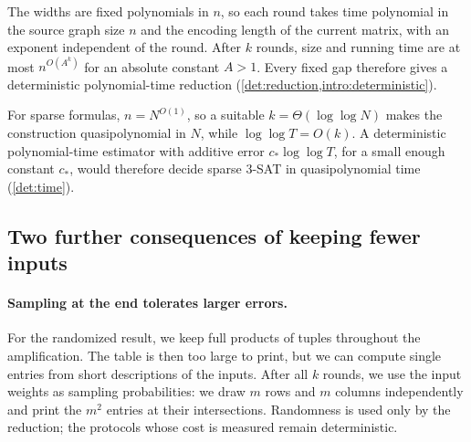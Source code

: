 \documentclass[11pt,letterpaper]{article} \usepackage[utf8]{inputenc}
\theoremstyle{plain} \newtheorem{theorem}{Theorem}[section]
\theoremstyle{definition} \newaliascnt{definition}{theorem}
\begin{document}
The widths are fixed polynomials in $n$, so each round takes time polynomial in the
source graph size $n$ and the encoding length of the current matrix,
with an exponent independent of the round. After $k$ rounds, size and
running time are at most $n^{O(A^k)}$ for an absolute constant $A>1$.
Every fixed gap therefore gives a deterministic polynomial-time
reduction (\cref{det:reduction,intro:deterministic}).

For sparse formulas, $n=N^{O(1)}$, so a suitable $k=\Theta(\log\log N)$ makes
the construction quasipolynomial in $N$, while $\log\log T=O(k)$.
A deterministic polynomial-time estimator with additive error $c_*\log\log T$, for a
small enough constant $c_*$, would therefore decide sparse $3$-SAT in quasipolynomial time
(\cref{det:time}).

\subsection{Two further consequences of keeping fewer inputs}

\paragraph{Sampling at the end tolerates larger errors.}
For the randomized result, we keep full products of tuples throughout the
amplification. The table is then too large to print, but we can compute
single entries from short descriptions of the inputs. After all $k$
rounds, we use the input weights as sampling probabilities: we draw $m$ rows
and $m$ columns independently and print the $m^2$ entries at their intersections.
Randomness is used only by the reduction; the protocols whose cost is
measured remain deterministic.
\end{document}
